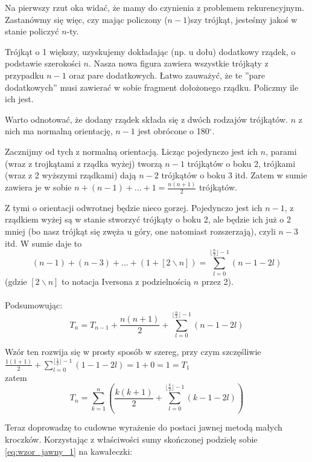 \documentclass[a4paper,11pt]{article}
\begin{document}
Na pierwszy rzut oka widać, że mamy do czynienia z problemem rekurencyjnym.
Zastanówmy się więc, czy mając policzony ($n-1$)szy trójkąt, jesteśmy jakoś w stanie policzyć $n$-ty.


Trójkąt o 1 większy, uzyskujemy dokładając (np. u dołu) dodatkowy rządek, o podstawie szerokości $n$.
Nasza nowa figura zawiera wszystkie trójkąty z przypadku $n-1$ oraz pare dodatkowych.
Łatwo zauważyć, że te ''pare dodatkowych'' musi zawierać w sobie fragment dołożonego rządku.
Policzmy ile ich jest.


Warto odnotować, że dodany rządek składa się z dwóch rodzajów trójkątów.
$n$ z nich ma normalną orientację, $n-1$ jest obrócone o 180$^{\circ}$.


Zacznijmy od tych z normalną orientacją.
Licząc pojedynczo jest ich $n$, parami (wraz z trojkątami z rządka wyżej) tworzą $n-1$ trójkątów o boku 2, trójkami (wraz z 2 wyższymi rządkami) dają $n-2$ trójkątów o boku 3 itd.
Zatem w sumie zawiera je w sobie $n + (n - 1) + ... + 1 = \frac{n(n+1)}{2}$ trójkątów.


Z tymi o orientacji odwrotnej będzie nieco gorzej.
Pojedynczo jest ich $n -1$, z rządkiem wyżej są w stanie stworzyć trójkąty o boku 2, ale będzie ich już o 2 mniej (bo nasz trójkąt się zwęża u góry, one natomiast rozszerzają), czyli $n - 3$ itd.
W sumie daje to 
\[
  (n - 1) + (n - 3) + ... + (1 + [2 \backslash n]) = \sum_{l=0}^{\lfloor \frac{n}{2} \rfloor - 1}(n - 1 - 2l)
\]
(gdzie $[2 \backslash n]$ to notacja Iversona z podzielnością $n$ przez 2). \\ \\


Podsumowując:
\begin{equation}
  T_{n} = T_{n-1} + \frac{n(n+1)}{2} + \sum_{l=0}^{\lfloor \frac{n}{2} \rfloor - 1}(n - 1 - 2l) \label{eq:wzor_rekurencyjny}
\end{equation}

Wzór ten rozwija się w prosty sposób w szereg, przy czym szczęśliwie
$\frac{1(1+1)}{2} + \sum_{l=0}^{\lfloor \frac{1}{2} \rfloor - 1}(1 - 1 - 2l) = 1 + 0 = 1 = T_{1}$\\


zatem
\begin{equation}
  T_{n} = \sum_{k=1}^{n} \left( \frac{k(k+1)}{2} + \sum_{l=0}^{\lfloor \frac{k}{2} \rfloor - 1}(k - 1 - 2l) \right) \label{eq:wzor_jawny_1}
\end{equation}

Teraz doprowadzę to cudowne wyrażenie do postaci jawnej metodą małych kroczków.
Korzystając z właściwości sumy skończonej podzielę sobie \ref{eq:wzor_jawny_1} na kawałeczki:
\end{document}
